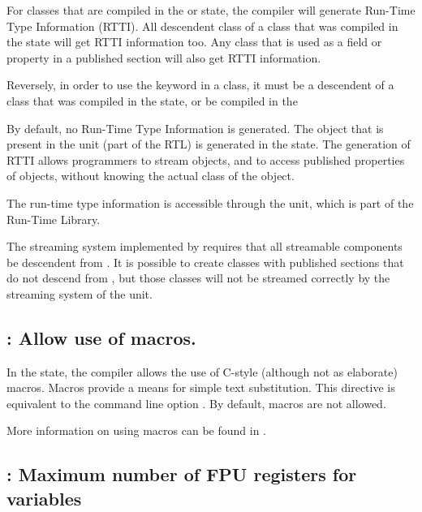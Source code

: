 For classes that are compiled in the  or 
state, the compiler will generate Run-Time Type Information (RTTI). All
descendent class of a class that was compiled in the  state
will get RTTI information too. Any class that is used as a field or property 
in a published section will also get RTTI information.

Reversely, in order to use the  keyword in a class, it must
be a descendent of a class that was compiled in the  state, or be
compiled in the 

By default, no Run-Time Type Information is generated. The 
object that is present in the  unit (part of the RTL) is generated in
the  state. The generation of RTTI allows programmers to
stream objects, and to access published properties of objects, without
knowing the actual class of the object.

The run-time type information is accessible through the  unit,
which is part of the \fpc Run-Time Library.

\begin{remark}
The streaming system implemented by \fpc requires that all
streamable components be descendent from . It is possible
to create classes with published sections that do not descend from
, but those classes will not be streamed correctly by the
streaming system of the  unit. 
\end{remark}

\subsection{ : Allow use of macros.}

In the  state, the compiler allows the use of C-style
(although not as elaborate) macros. Macros provide a means for simple text
substitution. This directive is equivalent to the command line option .
By default, macros are not allowed.

More information on using macros can be found in . 


\subsection{ : Maximum number of FPU registers for variables}

